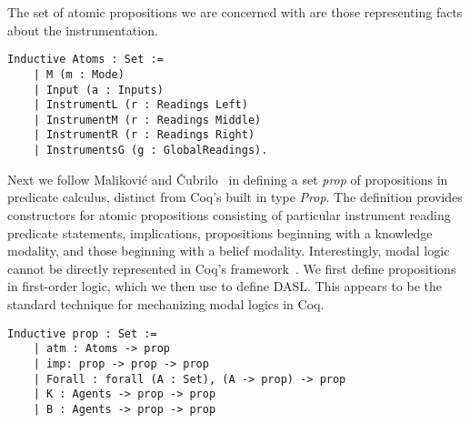 The set of atomic propositions we are concerned with are those representing facts about the instrumentation.


\begin{tcolorbox}
	\begin{lstlisting}[language=Coq]
	Inductive Atoms : Set := 
	| M (m : Mode)
	| Input (a : Inputs) 
	| InstrumentL (r : Readings Left) 
	| InstrumentM (r : Readings Middle) 
	| InstrumentR (r : Readings Right)
	| InstrumentsG (g : GlobalReadings).
	\end{lstlisting}
\end{tcolorbox}

Next we follow Malikovi\'c and \v Cubrilo~\cite{delcoq1,delcoq2} in defining a set \emph{prop} of propositions in predicate calculus, distinct from Coq's built in type \emph{Prop}. The definition provides constructors for atomic propositions consisting of particular instrument reading predicate statements, implications, propositions beginning with a knowledge modality, and those beginning with a belief modality. Interestingly, modal logic cannot be directly represented in Coq's framework~\cite{lescanne}. We first define propositions in first-order logic, which we then use to define DASL. This appears to be the standard technique for mechanizing modal logics in Coq. 

\begin{tcolorbox}
	\begin{lstlisting}[language=Coq]	
	Inductive prop : Set :=
	| atm : Atoms -> prop
	| imp: prop -> prop -> prop
	| Forall : forall (A : Set), (A -> prop) -> prop
	| K : Agents -> prop -> prop
	| B : Agents -> prop -> prop
	\end{lstlisting}
\end{tcolorbox}

